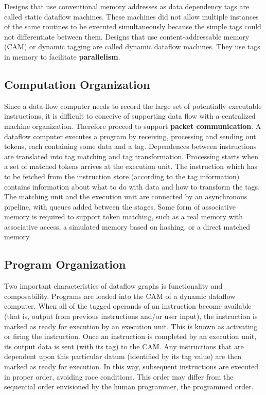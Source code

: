 \documentclass[UTF8,12pt,a4paper]{article}
\begin{document}
Designs that use conventional memory addresses as data dependency tags are called static dataflow machines.
These machines did not allow multiple instances of the same routines to be executed simultaneously
because the simple tags could not differentiate between them.
Designs that use content-addressable memory (CAM) or dynamic tagging are called dynamic dataflow machines.
They use tags in memory to facilitate \textbf{parallelism}.

\subsection{Computation Organization}
Since a data-flow computer needs to record
the large set of potentially executable instructions,
it is difficult to conceive of supporting
data flow with a centralized machine organization.
Therefore proceed to support \textbf{packet communication}.
A dataflow computer executes a program by receiving, processing and sending out tokens,
each containing some data and a tag. 
Dependences between instructions are translated into tag matching and tag transformation.
Processing starts when a set of matched tokens arrives at the execution unit.
The instruction which has to be fetched from the instruction store
(according to the tag information) contains information about  what to do with data  and how to transform the tags. 
The matching unit and the execution unit are connected by an asynchronous pipeline, with queues added between the stages. 
Some form of associative memory is required to support token matching,
such as a real memory with associative access, a simulated memory based on hashing,  or a direct matched memory.

\subsection{Program Organization}
Two important characteristics of dataflow graphs is functionality and composability.
Programs are loaded into the CAM of a dynamic dataflow computer.
When all of the tagged operands of an instruction become available (that is, output from previous instructions and/or user input),
the instruction is marked as ready for execution by an execution unit.
This is known as activating or firing the instruction.
Once an instruction is completed by an execution unit,
its output data is sent (with its tag) to the CAM.
Any instructions that are dependent upon this particular datum (identified by its tag value)
are then marked as ready for execution.
In this way, subsequent instructions are executed in proper order, avoiding race conditions.
This order may differ from the sequential order envisioned by the human programmer, the programmed order.
\end{document}
